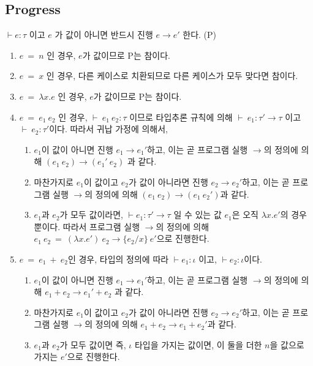 \documentclass[a4paper]{article}
\begin{document}
\subsection*{Progress}
$\vdash e : \tau$ 이고 $e$ 가 값이 아니면 반드시 진행 $e \rightarrow e'$ 한다. (P)\\
\begin{enumerate}
	\item $e\ =\ n$ 인 경우, $e$가 값이므로 P는 참이다.
	\item $e\ =\ x$ 인 경우, 다른 케이스로 치환되므로 다른 케이스가 모두 맞다면 참이다.
	\item $e\ =\ \lambda x.e$ 인 경우, $e$가 값이므로 P는 참이다.
	\item $e\ =\ {e}_{1}\ {e}_{2}$ 인 경우, $\vdash\ {e}_{1}\ {e}_{2}: \tau$ 이므로  타입추론 규칙에 의해 $\vdash\ {e}_{1}: \tau' \rightarrow \tau$ 이고 $\vdash\ {e}_{2}: \tau'$이다. 따라서 귀납 가정에 의해서,
\begin{enumerate}
	\item ${e}_{1}$이 값이 아니면 진행 ${e}_{1} \rightarrow {e}_{1}'$하고, 이는 곧 프로그램 실행 $\rightarrow$의 정의에 의해  $({e}_{1}\ {e}_{2}) \rightarrow ({e}_{1}'\ {e}_{2})$ 과 같다.
	\item 마찬가지로 ${e}_{1}$이 값이고 ${e}_{2}$가 값이 아니라면 진행 ${e}_{2} \rightarrow {e}_{2}'$하고, 이는 곧 프로그램 실행 $\rightarrow$의 정의에 의해 $({e}_{1}\ {e}_{2}) \rightarrow ({e}_{1}\ {e}_{2}')$과 같다. 
	\item ${e}_{1}$과 ${e}_{2}$가 모두 값이라면, $\vdash {e}_{1} : \tau' \rightarrow \tau$ 일 수 있는 값 ${e}_{1}$은 오직 $ \lambda x.e'$의 경우 뿐이다. 따라서 프로그램 실행 $\rightarrow$의 정의에 의해 ${e}_{1}\ {e}_{2}\ =\ (\lambda x.e')\ {e}_{2} \rightarrow \{{e}_{2}/{x}\}\ e'$으로 진행한다.
\end{enumerate}
\item $e\ =\ {e}_{1}\ +\ {e}_{2}$인 경우, 타입의 정의에 따라 $\vdash {e}_{1} : \iota$ 이고, $\vdash {e}_{2} : \iota$이다.
\begin{enumerate}
	\item ${e}_{1}$이 값이 아니면 진행 ${e}_{1} \rightarrow {e}_{1}'$하고, 이는 곧 프로그램 실행 $\rightarrow$의 정의에 의해  ${e}_{1} + {e}_{2} \rightarrow {e}_{1}' + {e}_{2}$ 과 같다.
	\item 마찬가지로 ${e}_{1}$이 값이고 ${e}_{2}$가 값이 아니라면 진행 ${e}_{2} \rightarrow {e}_{2}'$하고, 이는 곧 프로그램 실행 $\rightarrow$의 정의에 의해 ${e}_{1} + {e}_{2} \rightarrow {e}_{1} + {e}_{2}'$과 같다. 
	\item ${e}_{1}$과 ${e}_{2}$가 모두 값이면 즉, $\iota$ 타입을 가지는 값이면, 이 둘을 더한 $n$을 값으로 가지는 $e'$으로 진행한다.
\end{enumerate}
\end{enumerate}
\end{document}
